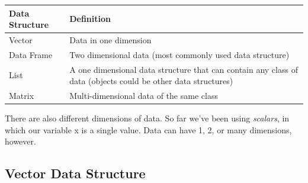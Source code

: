 \documentclass[]{book}
\begin{document}
\begin{longtable}[]{@{}ll@{}}
\toprule
\begin{minipage}[b]{0.18\columnwidth}\raggedright\strut
Data Structure\strut
\end{minipage} & \begin{minipage}[b]{0.24\columnwidth}\raggedright\strut
Definition\strut
\end{minipage}\tabularnewline
\midrule
\endhead
\begin{minipage}[t]{0.18\columnwidth}\raggedright\strut
Vector\strut
\end{minipage} & \begin{minipage}[t]{0.24\columnwidth}\raggedright\strut
Data in one dimension\strut
\end{minipage}\tabularnewline
\begin{minipage}[t]{0.18\columnwidth}\raggedright\strut
Data Frame\strut
\end{minipage} & \begin{minipage}[t]{0.24\columnwidth}\raggedright\strut
Two dimensional data (most commonly used data structure)\strut
\end{minipage}\tabularnewline
\begin{minipage}[t]{0.18\columnwidth}\raggedright\strut
List\strut
\end{minipage} & \begin{minipage}[t]{0.24\columnwidth}\raggedright\strut
A one dimensional data structure that can contain any class of data
(objects could be other data structures)\strut
\end{minipage}\tabularnewline
\begin{minipage}[t]{0.18\columnwidth}\raggedright\strut
Matrix\strut
\end{minipage} & \begin{minipage}[t]{0.24\columnwidth}\raggedright\strut
Multi-dimensional data of the same class\strut
\end{minipage}\tabularnewline
\bottomrule
\end{longtable}

There are also different dimensions of data. So far we've been using
\emph{scalars}, in which our variable x is a single value. Data can have
1, 2, or many dimensions, however.

\subsection{Vector Data Structure}\label{vector-data-structure}
\end{document}
